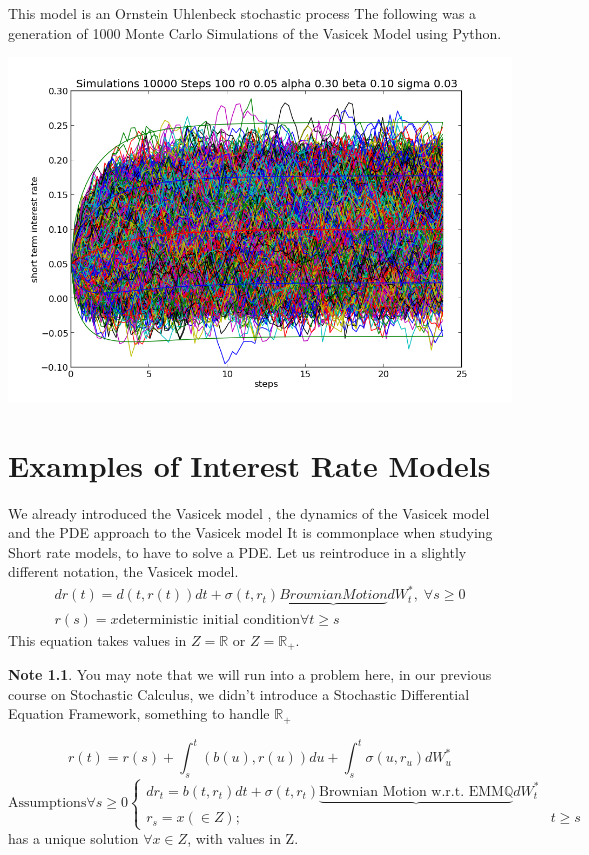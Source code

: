 \documentclass[10pt, oneside, reqno]{amsbook}
\theoremstyle{plain}%
\theoremstyle{definition}
\theoremstyle{rem}
\newtheorem*{note}{Note}
\theoremstyle{definition}
\def\Qbb{\ensuremath{\mathbb{Q}}}
\def\Rbb{\ensuremath{\mathbb{R}}}
\numberwithin{equation}{chapter}
\begin{document}
This model is an Ornstein Uhlenbeck stochastic process
The following was a generation of 1000 Monte Carlo Simulations of the Vasicek Model using Python.
\begin{center}
 \includegraphics[bb=0 0 672 459,scale=0.5]{monte_carlo_simulation_interestrates.png}
\end{center}
\chapter{Examples of Interest Rate Models}
We already introduced the Vasicek model \cite{vasicek_s_model}, the dynamics
of the Vasicek model \cite{vasicek_short_rate_dynamics}and the PDE approach to the Vasicek model\cite{sub:pde_approach_to_vasicek_s_model}
 It is commonplace when studying Short rate models, to have to solve a PDE. 
Let us reintroduce in a slightly different notation, the Vasicek model. 
\begin{align*}
 dr(t) = d(t, r(t))dt + \sigma (t, r_{t}) \underbrace{Brownian Motion}{dW^*_t}, \; \forall s \geq 0 \\
r(s) = x \text{deterministic initial condition} \forall t \geq s
\end{align*}
This equation takes values in $Z = \Rbb$ or $Z = \Rbb_+$. 
\begin{note}
 You may note that we will run into a problem here, in our previous course on Stochastic Calculus, we didn't introduce 
a Stochastic Differential Equation Framework, something to handle $\Rbb_+$
\end{note}
\begin{equation*}
 r(t) = r(s) + \int_s^t (b(u), r(u))du + \int_s^t \sigma (u, r_u)dW^*_u
\end{equation*}
\begin{equation*}
\text{Assumptions} \forall s \geq 0
\begin{cases} dr_t = b(t,r_t)dt + \sigma(t, r_t) \underbrace{\text{Brownian Motion w.r.t. EMM$\Qbb$}}{dW^*_t} 
\\
r_s = x (\in Z); & t \geq s
\end{cases}
\end{equation*}
has a unique solution $\forall x \in Z$, with values in Z.
\end{document}

